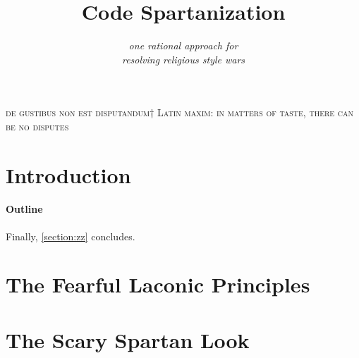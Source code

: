 \documentclass[preprint,10pt,nonatbib]{sigplanconf}
\title{Code Spartanization}
\subtitle{\scriptsize \emph{one rational approach for \\ resolving  religious style wars}}
\begin{document}
\textsc{de gustibus non est disputandum†{%
    Latin maxim: in matters of taste, there can be no disputes
}}
{\let\newpage\relax\maketitle}
% 
% 


\begin{abstract}
  
\end{abstract}
\section{Introduction}


\paragraph{Outline}
\label{section:principia}
\label{section:techniques}
\label{section:look}
\label{section:jack}
\label{section:look}
\label{section:initial}
\label{section:zz}
Finally, \cref{section:zz} concludes.

\section{The Fearful Laconic Principles}
\label{section:principia}


\section{The Scary Spartan Look}
\label{section:look}

\end{document}
